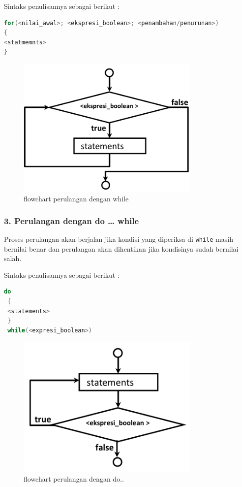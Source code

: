 Sintaks penulisannya sebagai berikut :

\begin{lstlisting}[language=c++, numbers=none]
for(<nilai_awal>; <ekspresi_boolean>; <penambahan/penurunan>)
{
<statmemnts>
}
\end{lstlisting}

\begin{figure}[htbp]
\centering
\includegraphics[width=0.8\textwidth]{images/capture2-9.png}
\caption{flowchart perulangan dengan while}
\end{figure}

\subsubsection{3. Perulangan dengan do \ldots{}
while}\label{perulangan-dengan-do-while}

Proses perulangan akan berjalan jika kondisi yang diperiksa di
\texttt{while} masih bernilai benar dan perulangan akan dihentikan jika
kondisinya sudah bernilai salah.

Sintaks penulisannya sebagai berikut :

\begin{lstlisting}[language=c++, numbers=none]
 do
 {
 <statements>
 }
 while(<expresi_boolean>)
\end{lstlisting}

\begin{figure}[htbp]
\centering
\includegraphics[width=0.8\textwidth]{images/capture2-10.png}
\caption{flowchart perulangan dengan do..}
\end{figure}

